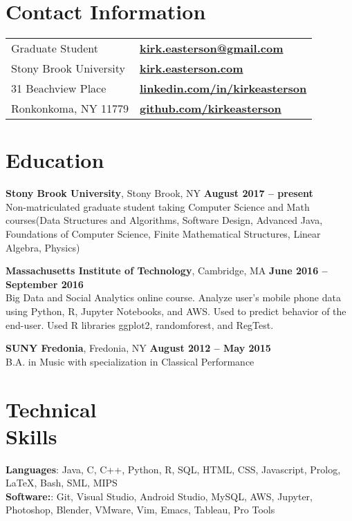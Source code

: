 \documentclass[margin,line]{res}
\begin{document}

\begin{resume}
\section{\sc Contact Information}

\vspace{.05in}
\begin{tabular}{@{}p{3.5in}p{3in}}
Graduate Student      & {\bf \href{mailto:kirk.easterson@gmail.com}{kirk.easterson@gmail.com}} \\
Stony Brook University & {\bf \href{http://www.kirkeasterson.com}{kirk.easterson.com}}\\
31 Beachview Place & {\bf \href{http://www.linkedin.com/in/kirkeasterson}{linkedin.com/in/kirkeasterson}}\\
Ronkonkoma, NY 11779 & {\bf \href{https://www.github.com/kirkeasterson}{github.com/kirkeasterson}}
\end{tabular}

\section{\sc Education}
{\bf Stony Brook University}, Stony Brook, NY \hfill {\bf August 2017 -- present}\\
Non-matriculated graduate student taking Computer Science and Math courses(Data Structures and Algorithms, Software Design, Advanced Java, Foundations of Computer Science, Finite Mathematical Structures, Linear Algebra, Physics)

{\bf Massachusetts Institute of Technology}, Cambridge, MA \hfill {\bf June 2016 -- September 2016}\\
Big Data and Social Analytics online course. Analyze user's mobile phone data using Python, R, Jupyter Notebooks, and AWS. Used to predict behavior of the end-user. Used R libraries ggplot2, randomforest, and RegTest.

{\bf SUNY Fredonia}, Fredonia, NY \hfill {\bf August 2012 -- May 2015}\\
B.A. in Music with specialization in Classical Performance

\section{\sc Technical\\Skills}
{\bf Languages}:  Java, C, C++, Python, R, SQL, HTML, CSS, Javascript, Prolog, {\LaTeX}, Bash, SML, MIPS\\
{\bf Software:}: Git, Visual Studio, Android Studio, MySQL, AWS, Jupyter, Photoshop, Blender, VMware, Vim, Emacs, Tableau, Pro Tools


\end{resume}
\end{document}
